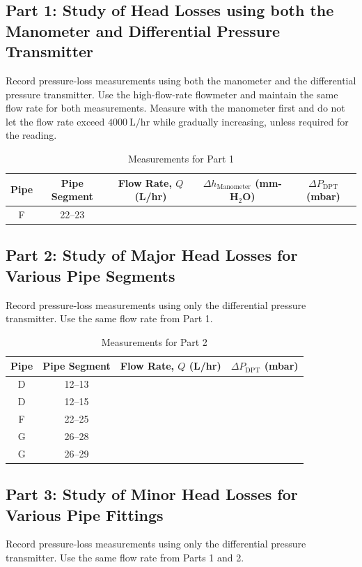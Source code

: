 \documentclass[12pt,letterpaper]{article}
\begin{document}
\subsection{Part 1: Study of Head Losses using both the Manometer and Differential Pressure Transmitter}
Record pressure-loss measurements using both the manometer and the differential pressure transmitter. Use the high-flow-rate flowmeter and maintain the same flow rate for both measurements. Measure with the manometer first and do not let the flow rate exceed \(4000~\mathrm{L/hr}\) while gradually increasing, unless required for the reading.

\begin{table}[H]
\centering
\caption{Measurements for Part 1}
\label{tab:part1}
\begin{tabular}{ccccc}
\toprule
Pipe & Pipe Segment & Flow Rate, \(Q\) (L/hr) & \(\Delta h_{\text{Manometer}}\) (mm-H\(_2\)O) & \(\Delta P_{\text{DPT}}\) (mbar) \\
\midrule
F & 22--23 & & & \\
\bottomrule
\end{tabular}
\end{table}

\subsection{Part 2: Study of Major Head Losses for Various Pipe Segments}
Record pressure-loss measurements using only the differential pressure transmitter. Use the same flow rate from Part 1.

\begin{table}[H]
\centering
\caption{Measurements for Part 2}
\label{tab:part2}
\begin{tabular}{cccc}
\toprule
Pipe & Pipe Segment & Flow Rate, \(Q\) (L/hr) & \(\Delta P_{\text{DPT}}\) (mbar) \\
\midrule
D & 12--13 & & \\
D & 12--15 & & \\
F & 22--25 & & \\
G & 26--28 & & \\
G & 26--29 & & \\
\bottomrule
\end{tabular}
\end{table}

\subsection{Part 3: Study of Minor Head Losses for Various Pipe Fittings}
Record pressure-loss measurements using only the differential pressure transmitter. Use the same flow rate from Parts 1 and 2.
\end{document}
